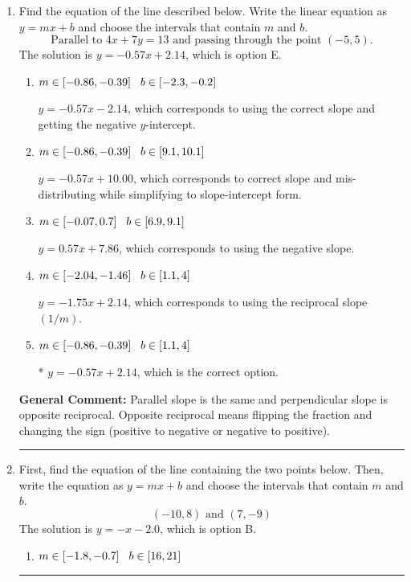 \documentclass{extbook}[14pt]
\newcommand{\litem}[1]{\item #1

\rule{\textwidth}{0.4pt}}
\begin{document}
\begin{enumerate}\litem{
Find the equation of the line described below. Write the linear equation as $ y=mx+b $ and choose the intervals that contain $m$ and $b$.
\[ \text{Parallel to } 4 x + 7 y = 13 \text{ and passing through the point } (-5, 5). \]The solution is \( y = -0.57x + 2.14 \), which is option E.\begin{enumerate}[label=\Alph*.]
\item \( m \in [-0.86, -0.39] \hspace*{3mm} b \in [-2.3, -0.2] \)

 $y = -0.57x - 2.14$, which corresponds to using the correct slope and getting the negative $y$-intercept.
\item \( m \in [-0.86, -0.39] \hspace*{3mm} b \in [9.1, 10.1] \)

 $y = -0.57x + 10.00$, which corresponds to correct slope and mis-distributing while simplifying to slope-intercept form.
\item \( m \in [-0.07, 0.7] \hspace*{3mm} b \in [6.9, 9.1] \)

 $y = 0.57x + 7.86$, which corresponds to using the negative slope.
\item \( m \in [-2.04, -1.46] \hspace*{3mm} b \in [1.1, 4] \)

 $y = -1.75x + 2.14$, which corresponds to using the reciprocal slope $(1/m)$.
\item \( m \in [-0.86, -0.39] \hspace*{3mm} b \in [1.1, 4] \)

* $y = -0.57x + 2.14$, which is the correct option.
\end{enumerate}

\textbf{General Comment:} Parallel slope is the same and perpendicular slope is opposite reciprocal. Opposite reciprocal means flipping the fraction and changing the sign (positive to negative or negative to positive).
}
\litem{
First, find the equation of the line containing the two points below. Then, write the equation as $ y=mx+b $ and choose the intervals that contain $m$ and $b$.
\[ (-10, 8) \text{ and } (7, -9) \]The solution is \( y = -x -2.0 \), which is option B.\begin{enumerate}[label=\Alph*.]
\item \( m \in [-1.8, -0.7] \hspace*{3mm} b \in [16, 21] \)


\end{enumerate}}
\end{enumerate}
\end{document}
